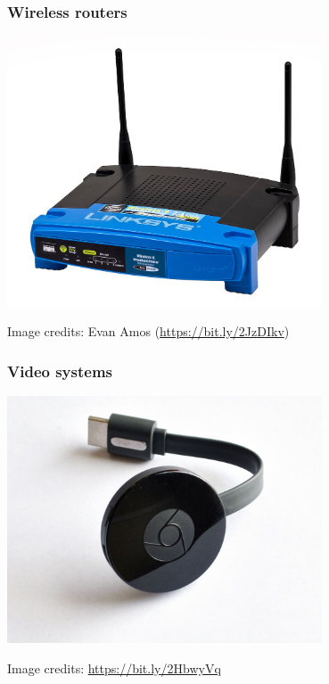 \begin{frame}
  \frametitle{Wireless routers}
  \begin{center}
    \includegraphics[width=0.7\textwidth]{slides/sysdev-intro/linksys-wireless-router.jpg}
  \end{center}
  \tiny
  Image credits: Evan Amos (\url{https://bit.ly/2JzDIkv})
\end{frame}

\begin{frame}
\frametitle{Video systems}
  \begin{center}
    \includegraphics[width=0.7\textwidth]{slides/sysdev-intro/chromecast-2015.jpg}
  \end{center}
  \tiny Image credits: \url{https://bit.ly/2HbwyVq}
\end{frame}

